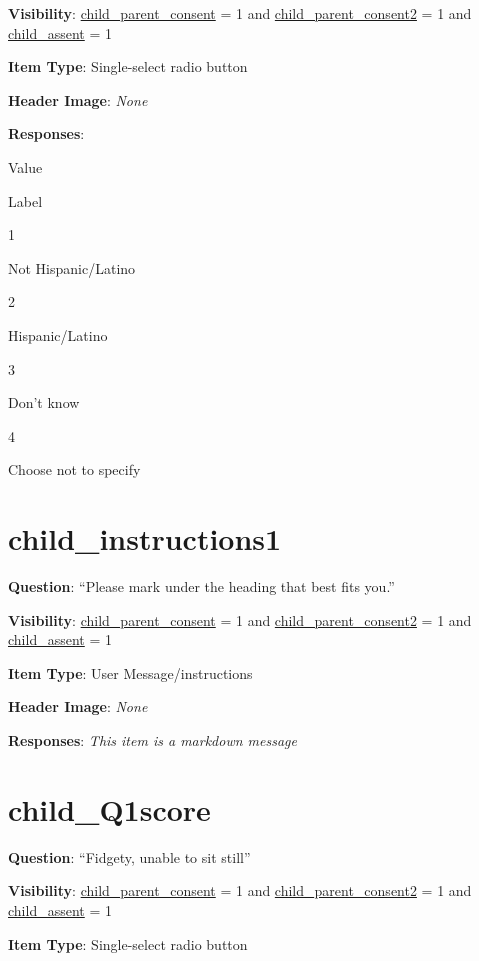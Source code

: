 \documentclass[]{book}
\begin{document}
\textbf{Visibility}: \protect\hyperlink{child_parent_consent}{child\_parent\_consent} = 1 and \protect\hyperlink{child_parent_consent2}{child\_parent\_consent2} = 1 and \protect\hyperlink{child_assent}{child\_assent} = 1

\textbf{Item Type}: Single-select radio button

\textbf{Header Image}: \emph{None}

\textbf{Responses}:

Value

Label

1

Not Hispanic/Latino

2

Hispanic/Latino

3

Don't know

4

Choose not to specify

\hypertarget{child_instructions1}{%
\section{child\_instructions1}\label{child_instructions1}}

\textbf{Question}: ``Please mark under the heading that best fits you.''

\textbf{Visibility}: \protect\hyperlink{child_parent_consent}{child\_parent\_consent} = 1 and \protect\hyperlink{child_parent_consent2}{child\_parent\_consent2} = 1 and \protect\hyperlink{child_assent}{child\_assent} = 1

\textbf{Item Type}: User Message/instructions

\textbf{Header Image}: \emph{None}

\textbf{Responses}: \emph{This item is a markdown message}

\hypertarget{child_q1score}{%
\section{child\_Q1score}\label{child_q1score}}

\textbf{Question}: ``Fidgety, unable to sit still''

\textbf{Visibility}: \protect\hyperlink{child_parent_consent}{child\_parent\_consent} = 1 and \protect\hyperlink{child_parent_consent2}{child\_parent\_consent2} = 1 and \protect\hyperlink{child_assent}{child\_assent} = 1

\textbf{Item Type}: Single-select radio button
\end{document}
